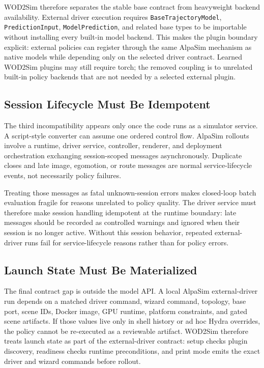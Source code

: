 \documentclass{article}
\begin{document}
WOD2Sim therefore separates the stable base contract from heavyweight backend
availability. External driver execution requires \texttt{BaseTrajectoryModel},
\texttt{PredictionInput}, \texttt{ModelPrediction}, and related base types to be
importable without installing every built-in model backend. This makes the plugin
boundary explicit: external policies can register through the same AlpaSim mechanism as
native models while depending only on the selected driver contract. Learned WOD2Sim
plugins may still require torch; the removed coupling is to unrelated built-in policy
backends that are not needed by a selected external plugin.

\subsection{Session Lifecycle Must Be Idempotent}

The third incompatibility appears only once the code runs as a simulator service. A
script-style converter can assume one ordered control flow. AlpaSim rollouts involve a
runtime, driver service, controller, renderer, and deployment orchestration exchanging
session-scoped messages asynchronously. Duplicate closes and late image, egomotion, or
route messages are normal service-lifecycle events, not necessarily policy failures.

Treating those messages as fatal unknown-session errors makes closed-loop batch
evaluation fragile for reasons unrelated to policy quality. The driver service must
therefore make session handling idempotent at the runtime boundary: late messages should
be recorded as controlled warnings and ignored when their session is no longer active.
Without this session behavior, repeated external-driver runs fail for service-lifecycle
reasons rather than for policy errors.

\subsection{Launch State Must Be Materialized}

The final contract gap is outside the model API. A local AlpaSim external-driver run
depends on a matched driver command, wizard command, topology, base port, scene IDs,
Docker image, GPU runtime, platform constraints, and gated scene artifacts. If those
values live only in shell history or ad hoc Hydra overrides, the policy cannot be
re-executed as a reviewable artifact. WOD2Sim therefore treats launch state as part
of the external-driver contract: setup checks plugin discovery, readiness checks runtime
preconditions, and print mode emits the exact driver and wizard commands before rollout.
\end{document}
